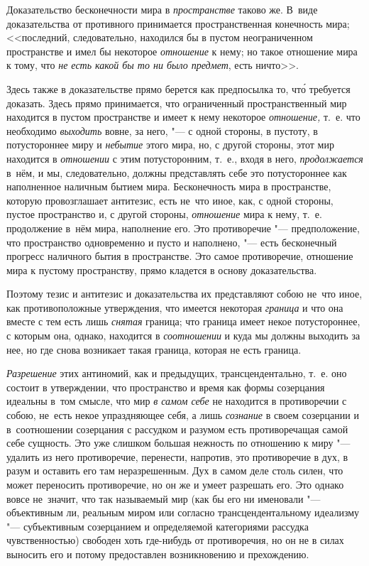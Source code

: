 Доказательство бесконечности мира в {\em пространстве} таково же. В~виде
доказательства от противного принимается пространственная конечность мира;
<<последний, следовательно, находился бы в пустом неограниченном пространстве
и имел бы некоторое {\em отношение} к нему; но такое отношение мира к тому, что
{\em не есть какой бы то ни было предмет}, есть ничто>>.

Здесь также в доказательстве прямо берется как предпосылка то, чт\'{о} требуется
доказать. Здесь прямо принимается, что ограниченный пространственный мир
находится в пустом пространстве и имеет к нему некоторое {\em отношение,} т.~е.
что необходимо {\em выходить} вовне, за него, "--- с одной стороны, в пустоту,
в потустороннее миру и {\em небытие} этого мира, но, с другой стороны, этот мир
находится в {\em отношении} с этим потусторонним, т.~е., входя в него,
{\em продолжается} в~нём, и мы, следовательно, должны представлять себе это
потустороннее как наполненное наличным бытием мира. Бесконечность мира в
пространстве, которую провозглашает антитезис, есть не~что иное, как, с одной
стороны, пустое пространство и, с другой стороны, {\em отношение} мира к нему,
т.~е. продолжение в~нём мира, наполнение его. Это противоречие "--- предположение,
что пространство одновременно и пусто и наполнено, "--- есть бесконечный прогресс
наличного бытия в пространстве. Это самое противоречие, отношение мира к пустому
пространству, прямо кладется в основу доказательства.

Поэтому тезис и антитезис и доказательства их представляют собою не~что иное,
как противоположные утверждения, что имеется некоторая {\em граница} и что она
вместе с тем есть лишь {\em снятая} граница; что граница имеет некое
потустороннее, с которым она, однако, находится в {\em соотношении} и куда мы
должны выходить за нее, но где снова возникает такая граница, которая не есть
граница.

{\em Разрешение} этих антиномий, как и предыдущих, трансцендентально, т.~е. оно
состоит в утверждении, что пространство и время как формы созерцания идеальны
в~том смысле, что мир {\em в самом себе} не находится в противоречии с собою,
не~есть некое упраздняющее себя, а лишь {\em сознание} в своем созерцании и
в~соотношении созерцания с рассудком и разумом есть противоречащая самой себе
сущность. Это уже слишком большая нежность по отношению к миру "--- удалить из
него противоречие, перенести, напротив, это противоречие в дух, в разум и
оставить его там неразрешенным. Дух в самом деле столь силен, что может
переносить противоречие, но он же и умеет разрешать его. Это однако вовсе
не~значит, что так называемый мир (как бы его ни именовали "--- объективным ли,
реальным миром или согласно трансцендентальному идеализму "--- субъективным
созерцанием и определяемой категориями рассудка чувственностью) свободен хоть
где-нибудь от противоречия, но он не в силах выносить его и потому предоставлен
возникновению и прехождению.


